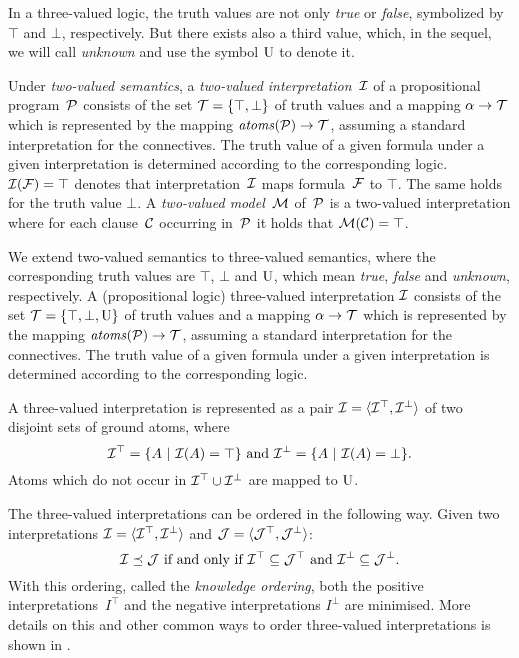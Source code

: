 In a three-valued logic, the truth values are not only \textit{true} or \textit{false}, symbolized by $\top$ and $\bot$, respectively. But there exists also a third value, which, in the sequel, we will call \textit{\textit{unknown}} and use the symbol $\mbox{\normalfont U}$ to denote it.

\begin{definition}
\normalfont 
Under \textit{two-valued semantics}, a \textit{two-valued interpretation}~$\mathcal{I}$ of a propositional program~$\mathcal{P}$ consists of the set $\mathcal{T} = \{\top, \bot\}$ of truth values and a mapping $\alpha \rightarrow \mathcal{T}$ which is represented by the mapping $\mathit{atoms}(\mathcal{P}) \rightarrow \mathcal{T}$, assuming a standard interpretation for the connectives. The truth value of a given formula under a given interpretation is determined according to the corresponding logic. $\mathcal{I}(\mathcal{F}) = \top$ denotes that interpretation~$\mathcal{I}$ maps formula~$\mathcal{F}$ to $\top$. The same holds for the truth value $\bot$. A \textit{two-valued model}~$\mathcal{M}$ of~$\mathcal{P}$ is a two-valued interpretation where for each clause~$\mathcal{C}$ occurring in~$\mathcal{P}$ it holds that $\mathcal{M}(\mathcal{C}) = \top$.

We extend two-valued semantics to three-valued semantics, where the corresponding truth values are $\top$, $\bot$ and $\mbox{\normalfont U}$, which mean \textit{true}, \textit{false} and \textit{unknown}, respectively. A (propositional logic) three-valued interpretation $\mathcal{I}$ consists of the set $\mathcal{T} = \{\top, \bot, \mbox{\normalfont U}\}$ of truth values and a mapping $\alpha \rightarrow \mathcal{T}$ which is represented by the mapping $\mathit{atoms}(\mathcal{P}) \rightarrow \mathcal{T}$, assuming a standard interpretation for the connectives. The truth value of a given formula under a given interpretation is determined according to the corresponding logic. 

A three-valued interpretation is represented as a pair $\mathcal{I} = \langle \mathcal{I}^\top, \mathcal{I}^\bot \rangle$ of two disjoint sets of ground atoms, where
\[
\mathcal{I}^\top = \{ A \mbox{ | } \mathcal{I}(A) = \top\} \mbox{ and } \mathcal{I}^\bot = \{A \mbox{ | } \mathcal{I}(A) = \bot\}.
\]
Atoms which do not occur in $\mathcal{I}^\top \cup \mathcal{I}^\bot$ are mapped to $\mbox{\normalfont U}$. 

The three-valued interpretations can be ordered in the following way. Given two interpretations $\mathcal{I} = \langle \mathcal{I}^\top, \mathcal{I}^\bot \rangle$ and $\mathcal{J} = \langle \mathcal{J}^\top, \mathcal{J}^\bot \rangle$:
\[
\mathcal{I} \preceq \mathcal{J} \mbox{ if and only if } \mathcal{I}^\top \subseteq \mathcal{J}^\top \mbox{ and } \mathcal{I}^\bot \subseteq \mathcal{J}^\bot.
\]
With this ordering, called the \textit{knowledge ordering}, both the positive interpretations~$I^\top$ and the negative interpretations $I^\bot$ are minimised. More details on this and other common ways to order three-valued interpretations is shown in \cite{ruiz1994computing}. 


\end{definition}
